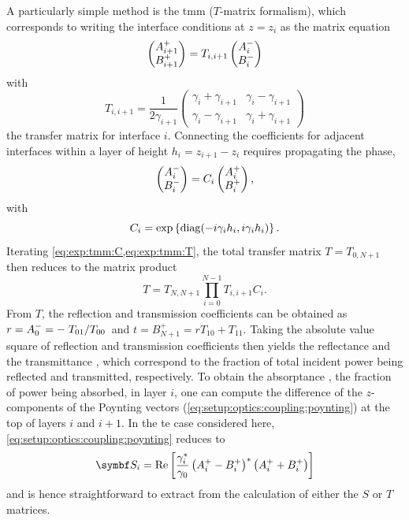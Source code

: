 A particularly simple method is the \acrlong{tmm} ($T$-matrix formalism), which corresponds to writing the interface conditions at $z=z_i$ as the matrix equation
\begin{equation}\label{eq:exp:tmm:interface}
    \pmqty{A_{i+1}^{+}\\B_{i+1}^{+}} = T_{i,i+1}\pmqty{A_{i}^{-}\\B_{i}^{-}}
\end{equation}
with
\begin{equation}\label{eq:exp:tmm:T}
    T_{i,i+1} = \frac{1}{2\gamma_{i+1}}\begin{pmatrix}
        \gamma_{i} + \gamma_{i+1} & \gamma_{i} - \gamma_{i+1} \\
        \gamma_{i} - \gamma_{i+1} & \gamma_{i} + \gamma_{i+1}
    \end{pmatrix}
\end{equation}
the transfer matrix for interface $i$.
Connecting the coefficients for adjacent interfaces within a layer of height $h_i = z_{i+1} - z_{i}$ requires propagating the phase,
\begin{equation}\label{eq:exp:tmm:propagation}
    \pmqty{A_{i}^{-}\\B_{i}^{-}} = C_{i}\pmqty{A_{i}^{+}\\B_{i}^{+}},
\end{equation}
with
\begin{equation}\label{eq:exp:tmm:C}
    C_{i} = \exp\left\lbrace\operatorname{diag}(-i\gamma_i h_i, i\gamma_i h_i)\right\rbrace.
\end{equation}
Iterating \cref{eq:exp:tmm:C,eq:exp:tmm:T}, the total transfer matrix $T = T_{0,N+1}$ then reduces to the matrix product
\begin{equation}\label{eq:exp:tmm:T:total}
    T = T_{N,N+1}\prod_{i=0}^{N-1} T_{i,i+1} C_i.
\end{equation}
From $T$, the reflection and transmission coefficients can be obtained as $r=A_0^{-}=-\flatfrac{T_{01}}{T_{00}}$ and $t=B_{N+1}^{+}=rT_{10} + T_{11}$.
Taking the absolute value square of reflection and transmission coefficients then yields the reflectance  and the transmittance \transmittance, which correspond to the fraction of total incident power being reflected and transmitted, respectively.
To obtain the absorptance \absorptance, the fraction of power being absorbed, in layer $i$, one can compute the difference of the $z$-components of the Poynting vectors (\cf \cref{eq:setup:optics:coupling:poynting}) at the top of layers $i$ and $i+1$.
In the \gls{te} case considered here, \cref{eq:setup:optics:coupling:poynting} reduces to~\cite{Langevin2024}
\begin{equation}\label{eq:exp:tmm:poynting}
    \bvec{S}_i = \re\left[\frac{\gamma_i^{\ast}}{\gamma_0}\left(A_i^{+} - B_i^{+}\right)^{\ast}\left(A_i^{+} + B_i^{+}\right)\right]
\end{equation}
and is hence straightforward to extract from the calculation of either the $S$ or $T$ matrices.

